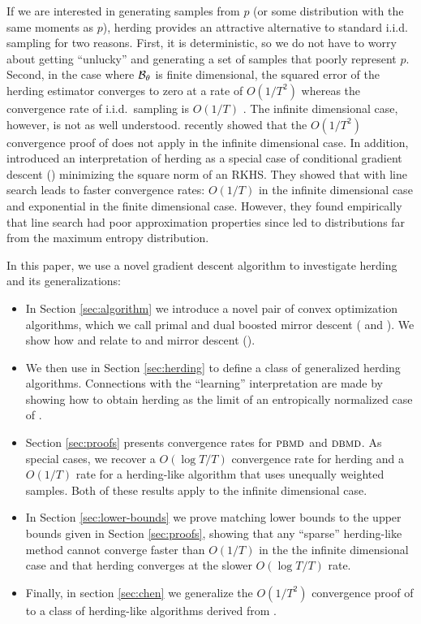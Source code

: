 \documentclass[paper.tex]{subfiles}
\begin{document}
If we are interested in generating samples from $p$ (or some distribution with the same moments as $p$), herding provides an attractive alternative to standard i.i.d. sampling for two reasons. First, it is deterministic, so we do not have to worry about getting ``unlucky'' and generating a set of samples that poorly represent  $p$. Second, in the case where $\mathcal{B}_{\theta}$ is finite dimensional, the squared error of the herding estimator converges to zero at a rate of $O(1/T^{2})$ whereas the convergence rate of i.i.d.~sampling is $O(1/T)$ \citep{Chen:2010a}. The infinite dimensional case, however, is not as well understood. \citet{Bach:2012a} recently showed that the $O(1/T^{2})$ convergence proof of \citet{Chen:2010a} does not apply in the infinite dimensional case. In addition, \citet{Bach:2012a} introduced an interpretation of herding as a special case of conditional gradient descent () minimizing the square norm of an RKHS. They showed that  with line search leads to faster convergence rates: $O(1/T)$ in the infinite dimensional case and exponential in the finite dimensional case. However, they found  empirically that line search had poor approximation properties since led to distributions far from the maximum entropy distribution. 

In this paper, we use a novel gradient descent algorithm to investigate herding and its generalizations:
\begin{itemize}
\item In Section \ref{sec:algorithm} we introduce a novel pair of convex optimization algorithms, which we call primal and dual boosted mirror descent ( and ). We show how  and  relate to  and mirror descent (). 
\item We then use  in Section \ref{sec:herding} to define a class of generalized herding algorithms. Connections with the ``learning'' interpretation are made by showing how to obtain herding as the limit of an entropically normalized case of . 
\item Section \ref{sec:proofs} presents convergence rates for $\algname{PBMD}$ and $\algname{DBMD}$. As special cases, we recover a $O(\log T/ T)$ convergence rate for herding and a $O(1/T)$ rate for a herding-like algorithm that uses unequally weighted samples. Both of these results apply to the infinite dimensional case. 
\item In Section \ref{sec:lower-bounds} we prove matching lower bounds to the upper bounds given in Section \ref{sec:proofs}, showing that any ``sparse'' herding-like method cannot converge faster than $O(1/T)$ in the the infinite dimensional case and that herding converges at the slower $O(\log T / T)$ rate.
\item Finally, in section \ref{sec:chen} we generalize the $O(1/T^{2})$ convergence proof of \citet{Chen:2010a} to a class of herding-like algorithms derived from . 
\end{itemize}
\end{document}
